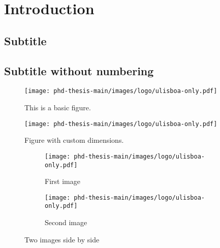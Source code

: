 \chapter{Introduction}

\section{Subtitle}

\section*{Subtitle without numbering}

\lipsum[3] \cite{wickham:2021aa}



\begin{figure}[htbp]
  \centering
  \texttt{[image: phd-thesis-main/images/logo/ulisboa-only.pdf]}
  \caption{This is a basic figure.}
  \label{fig:basic}
\end{figure}
 

\begin{figure}[htbp]
  \centering
  \texttt{[image: phd-thesis-main/images/logo/ulisboa-only.pdf]}
  \caption{Figure with custom dimensions.}
  \label{fig:customsize}
\end{figure}

\begin{figure}[htbp]
  \centering
  \begin{subfigure}[b]{0.45\textwidth}
    \texttt{[image: phd-thesis-main/images/logo/ulisboa-only.pdf]}
    \caption{First image}
    \label{fig:sub1}
  \end{subfigure}
  \hfill
  \begin{subfigure}[b]{0.45\textwidth}
    \texttt{[image: phd-thesis-main/images/logo/ulisboa-only.pdf]}
    \caption{Second image}
    \label{fig:sub2}
  \end{subfigure}
  \caption{Two images side by side}
  \label{fig:sidebyside}
\end{figure}

